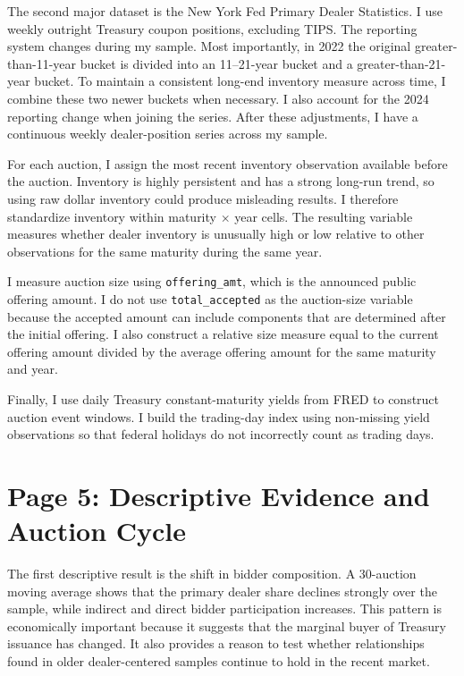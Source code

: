 \documentclass[12pt]{article}
\begin{document}
The second major dataset is the New York Fed Primary Dealer Statistics. I use weekly outright Treasury coupon positions, excluding TIPS. The reporting system changes during my sample. Most importantly, in 2022 the original greater-than-11-year bucket is divided into an 11--21-year bucket and a greater-than-21-year bucket. To maintain a consistent long-end inventory measure across time, I combine these two newer buckets when necessary. I also account for the 2024 reporting change when joining the series. After these adjustments, I have a continuous weekly dealer-position series across my sample.

For each auction, I assign the most recent inventory observation available before the auction. Inventory is highly persistent and has a strong long-run trend, so using raw dollar inventory could produce misleading results. I therefore standardize inventory within maturity $\times$ year cells. The resulting variable measures whether dealer inventory is unusually high or low relative to other observations for the same maturity during the same year.

I measure auction size using \texttt{offering\_amt}, which is the announced public offering amount. I do not use \texttt{total\_accepted} as the auction-size variable because the accepted amount can include components that are determined after the initial offering. I also construct a relative size measure equal to the current offering amount divided by the average offering amount for the same maturity and year.

Finally, I use daily Treasury constant-maturity yields from FRED to construct auction event windows. I build the trading-day index using non-missing yield observations so that federal holidays do not incorrectly count as trading days.

\newpage
\section{Page 5: Descriptive Evidence and Auction Cycle}

The first descriptive result is the shift in bidder composition. A 30-auction moving average shows that the primary dealer share declines strongly over the sample, while indirect and direct bidder participation increases. This pattern is economically important because it suggests that the marginal buyer of Treasury issuance has changed. It also provides a reason to test whether relationships found in older dealer-centered samples continue to hold in the recent market.
\end{document}
